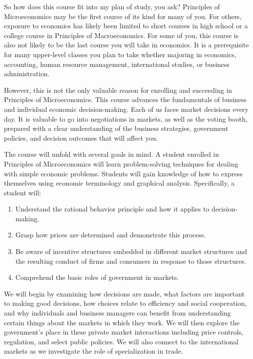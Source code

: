 \documentclass[
]{book}
\providecommand{\tightlist}{%
  \setlength{\itemsep}{0pt}\setlength{\parskip}{0pt}}
\begin{document}
So how does this course fit into my plan of study, you ask? Principles of Microeconomics may be the first course of its kind for many of you. For others, exposure to economics has likely been limited to short courses in high school or a college course in Principles of Macroeconomics. For some of you, this course is also not likely to be the last course you will take in economics. It is a prerequisite for many upper-level classes you plan to take whether majoring in economics, accounting, human resource management, international studies, or business administration.

However, this is not the only valuable reason for enrolling and succeeding in Principles of Microeconomics. This course advances the fundamentals of business and individual economic decision-making. Each of us faces market decisions every day. It is valuable to go into negotiations in markets, as well as the voting booth, prepared with a clear understanding of the business strategies, government policies, and decision outcomes that will affect you.

The course will unfold with several goals in mind. A student enrolled in Principles of Microeconomics will learn problem-solving techniques for dealing with simple economic problems. Students will gain knowledge of how to express themselves using economic terminology and graphical analysis. Specifically, a student will:

\begin{enumerate}
\def\labelenumi{\arabic{enumi}.}
\tightlist
\item
  Understand the rational behavior principle and how it applies to decision-making.
\item
  Grasp how prices are determined and demonstrate this process.
\item
  Be aware of incentive structures embedded in different market structures and the resulting conduct of firms and consumers in response to those structures.
\item
  Comprehend the basic roles of government in markets.
\end{enumerate}

We will begin by examining how decisions are made, what factors are important to making good decisions, how choices relate to efficiency and social cooperation, and why individuals and business managers can benefit from understanding certain things about the markets in which they work. We will then explore the government's place in these private market interactions including price controls, regulation, and select public policies. We will also connect to the international markets as we investigate the role of specialization in trade.
\end{document}
